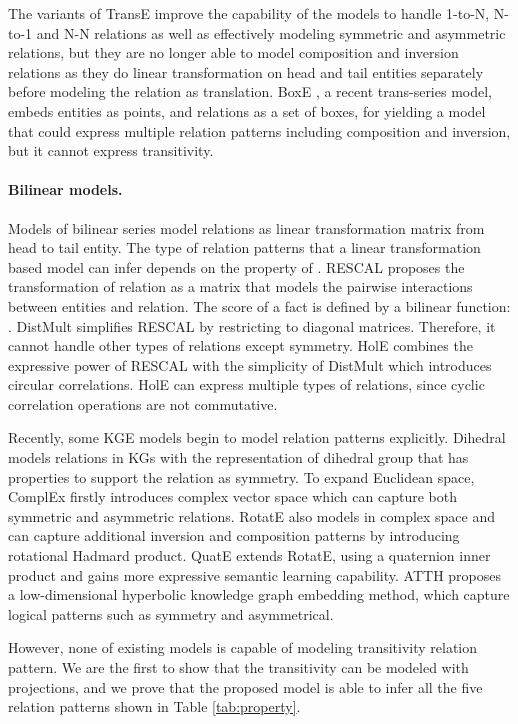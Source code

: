 \documentclass{article}
\begin{document}
The variants of TransE improve the capability of the models to handle 1-to-N, N-to-1 and N-N relations as well as effectively modeling symmetric and asymmetric relations, but they are no longer able to model composition and inversion relations as they do linear transformation on head and tail entities separately before modeling the relation as translation.
BoxE \citep{abboud2020boxe}, a recent trans-series model, embeds entities as points, and relations as a set of boxes, for yielding a model that could express multiple relation patterns including composition and inversion, but it cannot express transitivity.

\paragraph{Bilinear models.} Models of bilinear series model relations as linear transformation matrix  from head to tail entity. The type of relation patterns that a linear transformation based model can infer depends on the property of .
RESCAL \citep{Rescal} proposes the transformation of relation as a matrix that models the pairwise interactions between entities and relation. The score of a fact is defined by a bilinear function: .
DistMult \citep{distmult} simplifies RESCAL by restricting  to diagonal matrices. Therefore, it cannot handle other types of relations except symmetry.
HolE \citep{hole} combines the expressive power of RESCAL with the simplicity of DistMult which introduces circular correlations. HolE can express multiple types of relations, since cyclic correlation operations are not commutative.

Recently, some KGE models begin to model relation patterns explicitly. Dihedral \citep{dihedral} models relations in KGs with the representation of dihedral group that has properties to support the relation as symmetry.
To expand Euclidean space, ComplEx \citep{CompLex} firstly introduces complex vector space which can capture both symmetric and asymmetric relations.
RotatE \citep{rotate} also models in complex space and can capture additional inversion and composition patterns by introducing rotational Hadmard product.
QuatE \citep{zhang2019quaternion} extends RotatE, using a quaternion inner product and gains more expressive semantic learning capability. ATTH \citep{atth} proposes a low-dimensional hyperbolic knowledge graph embedding method, which capture logical patterns such as symmetry and asymmetrical.

However, none of existing models is capable of modeling transitivity relation pattern. We are the first to show that the transitivity can be modeled with projections, and we prove that the proposed model is able to infer all the five relation patterns shown in Table \ref{tab:property}.
\end{document}
